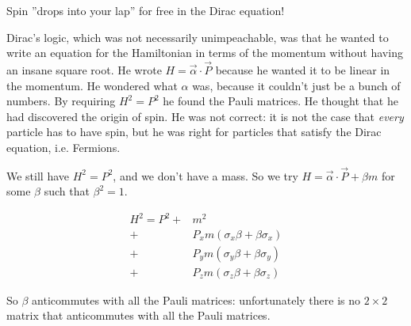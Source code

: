 \documentclass[]{article}
\begin{document}
Spin ''drops into your lap'' for free in the Dirac equation!

Dirac's logic, which was not necessarily unimpeachable, was that he wanted to write an equation for the Hamiltonian in terms of the momentum without having an insane square root. He wrote $	H = \vec{\alpha} \cdot \vec{P}$ because he wanted it to be linear in the momentum. He wondered what $\alpha$ was, because it couldn't just be a bunch of numbers. By requiring $H^2=P^2$ he found the Pauli matrices. He thought that he had discovered the origin of spin. He was not correct: it is not the case that \emph{every} particle has to have spin, but he was right for particles that satisfy the Dirac equation, i.e. Fermions.

We still have $H^2=P^2$, and we don't have a mass. So we try $H= \vec{\alpha} \cdot \vec{P}+\beta m$ for some $\beta$ such that $\beta^2=1$.

\begin{align*}
	H^2 = P^2 +& m^2 \\
	+& P_x m (\sigma_x \beta + \beta \sigma_x) \\
	+& P_y m (\sigma_y \beta + \beta \sigma_y) \\
	+& P_z m (\sigma_z \beta + \beta \sigma_z)
\end{align*}

So $\beta$ anticommutes with all the Pauli matrices: unfortunately there is no $2\times 2$ matrix that anticommutes with all the Pauli matrices.
\end{document}
